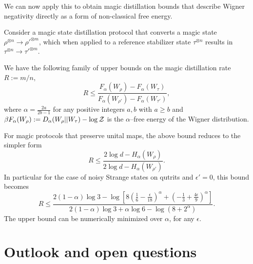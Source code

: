\documentclass[pra,
aps,
twocolumn,
superscriptaddress,
groupedaddress,
nofootinbib,
reprint
]{revtex4-1}
\begin{document}
We can now apply this to obtain magic distillation bounds that describe Wigner negativity directly as a form of non-classical free energy.
\begin{theorem}\label{thm:entropic_bounds} 
	Consider a magic state distillation protocol that converts a magic state $\rho^{\otimes n} \longrightarrow \rho'^{\otimes m}$, which when applied to a reference stabilizer state $\tau^{\otimes n}$ results in $\tau^{\otimes n} \longrightarrow \tau'^{\otimes m}$.
	
	We have the following family of upper bounds on the magic distillation rate $R := m/n$,
	\begin{equation}
		R \leq \frac{F_\alpha(W_\rho) - F_\alpha(W_\tau)}{F_\alpha(W_{\rho'}) - F_\alpha(W_{\tau'})},
	\end{equation}
	where $\alpha = \frac{2a}{2b-1}$ for any positive integers $a,b$ with $a \geq b$ and $\beta F_\alpha(W_\rho) := D_\alpha (W_\rho || W_\tau) - \log \mathcal{Z}$ is the $\alpha$--free energy of the Wigner distribution. 
\end{theorem}
For magic protocols that preserve unital maps, the above bound reduces to the simpler form
\begin{equation}
	R \leq \frac{2\log d - H_{\alpha}(W_\rho)}{2\log d - H_{\alpha}(W_{\rho'})}.
\end{equation}
In particular for the case of noisy Strange states on qutrits and $\epsilon'=0$, this bound becomes
\begin{equation}
	R \leq \frac{2(1-\alpha)\log 3 - \log \left [8(\frac{1}{6} - \frac{\epsilon}{18})^\alpha + (-\frac{1}{3} + \frac{4\epsilon}{9})^\alpha\right ] }{2(1-\alpha)\log 3 + \alpha \log 6 - \log (8 + 2^\alpha )}.
\end{equation}
The upper bound can be numerically minimized over $\alpha$, for any $\epsilon$.
%

\section{Outlook and open questions}
\label{sec:lower_bounds}
\end{document}
